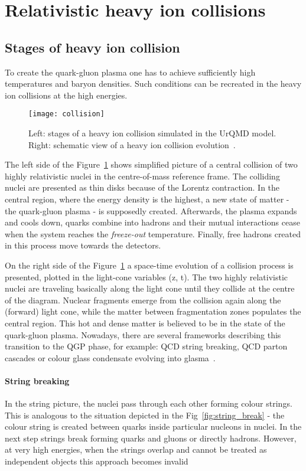   \section{Relativistic heavy ion collisions}
    \subsection{Stages of heavy ion collision}

      To create the quark-gluon plasma one has to achieve sufficiently high temperatures and baryon densities.
      Such conditions can be recreated in the heavy ion collisions at the high energies.
      \begin{figure}[h]
        \centering
        \texttt{[image: collision]}
        \caption{Left: stages of a heavy ion collision simulated in the UrQMD model. Right: schematic view of a heavy ion collision evolution~\cite{drkisiel}.}
        \label{fig:colision}
      \end{figure}
      The left side of the Figure~\ref{fig:colision} shows simplified picture of a central collision of two highly relativistic nuclei in the centre-of-mass reference frame.
      The colliding nuclei are presented as thin disks because of the Lorentz contraction.
      In the central region, where the energy density is the highest, a new state of matter - the quark-gluon plasma - is supposedly created.
      Afterwards, the plasma expands and cools down, quarks combine into hadrons and their mutual interactions cease when the system reaches the \textit{freeze-out} temperature.
      Finally, free hadrons created in this process move towards the detectors.

      On the right side of the Figure~\ref{fig:colision} a space-time evolution of a collision process is presented, plotted in the light-cone variables (z, t).
      The two highly relativistic nuclei are traveling basically along the light cone until they collide at the centre of the diagram. 
      Nuclear fragments emerge from the collision again along the (forward) light cone, while the matter between fragmentation zones populates the central region.
      This hot and dense matter is believed to be in the state of the quark-gluon plasma.
      Nowadays, there are several frameworks describing this transition to the QGP phase, for example: QCD string breaking, QCD parton cascades or colour glass condensate evolving into glasma~\cite{florkowski}.
      \paragraph{String breaking}
      In the string picture, the nuclei pass through each other forming colour strings.
      This is analogous to the situation depicted in the Fig~\ref{fig:string_break} -  the colour string is created between quarks inside particular nucleons in nuclei.
      In the next step strings break forming quarks and gluons or directly hadrons.
      However, at very high energies, when the strings overlap and cannot be treated as independent objects  this approach becomes invalid
